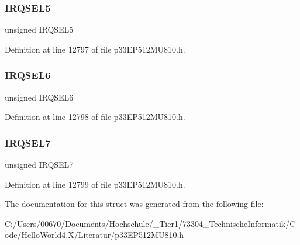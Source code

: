 \subsubsection{\texorpdfstring{I\+R\+Q\+S\+E\+L5}{IRQSEL5}}
{\footnotesize\ttfamily unsigned I\+R\+Q\+S\+E\+L5}



Definition at line 12797 of file p33\+E\+P512\+M\+U810.\+h.

\mbox{\label{structtag_d_m_a2_r_e_q_b_i_t_s_ace52408ef8c29561f3c56a3fbcbc8217}} 
\subsubsection{\texorpdfstring{I\+R\+Q\+S\+E\+L6}{IRQSEL6}}
{\footnotesize\ttfamily unsigned I\+R\+Q\+S\+E\+L6}



Definition at line 12798 of file p33\+E\+P512\+M\+U810.\+h.

\mbox{\label{structtag_d_m_a2_r_e_q_b_i_t_s_acce7dedecdf1f53cdbead3edf7c5d53a}} 
\subsubsection{\texorpdfstring{I\+R\+Q\+S\+E\+L7}{IRQSEL7}}
{\footnotesize\ttfamily unsigned I\+R\+Q\+S\+E\+L7}



Definition at line 12799 of file p33\+E\+P512\+M\+U810.\+h.



The documentation for this struct was generated from the following file\+:\begin{DoxyCompactItemize}
\item 
C\+:/\+Users/00670/\+Documents/\+Hochschule/\+\_\+\+Tier1/73304\+\_\+\+Technische\+Informatik/\+Code/\+Hello\+World4.\+X/\+Literatur/\hyperlink{p33_e_p512_m_u810_8h}{p33\+E\+P512\+M\+U810.\+h}\end{DoxyCompactItemize}

